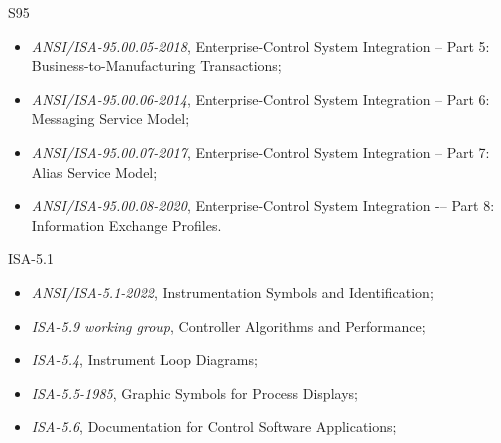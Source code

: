 \documentclass{beamer}
\begin{document}
{    \begin{frame}{S95}
        \begin{itemize}
            \item \textit {ANSI/ISA-95.00.05-2018}, Enterprise-Control System Integration -- Part 5: Business-to-Manufacturing Transactions;
            \item \textit {ANSI/ISA-95.00.06-2014}, Enterprise-Control System Integration -- Part 6: Messaging Service Model;
            \item \textit {ANSI/ISA-95.00.07-2017}, Enterprise-Control System Integration -- Part 7: Alias Service Model;
            \item \textit {ANSI/ISA-95.00.08-2020}, Enterprise-Control System Integration -– Part 8: Information Exchange Profiles.
        \end{itemize}
    \end{frame}

    \begin{frame}{ISA-5.1}
        \begin{itemize}
            \item \textit {ANSI/ISA-5.1-2022}, Instrumentation Symbols and Identification;
            \item \textit {ISA-5.9 working group}, Controller Algorithms and Performance;
            \item \textit {ISA-5.4}, Instrument Loop Diagrams;
            \item \textit {ISA-5.5-1985}, Graphic Symbols for Process Displays;
            \item \textit {ISA-5.6}, Documentation for Control Software Applications;
        \end{itemize}
    \end{frame}

}
\end{document}
